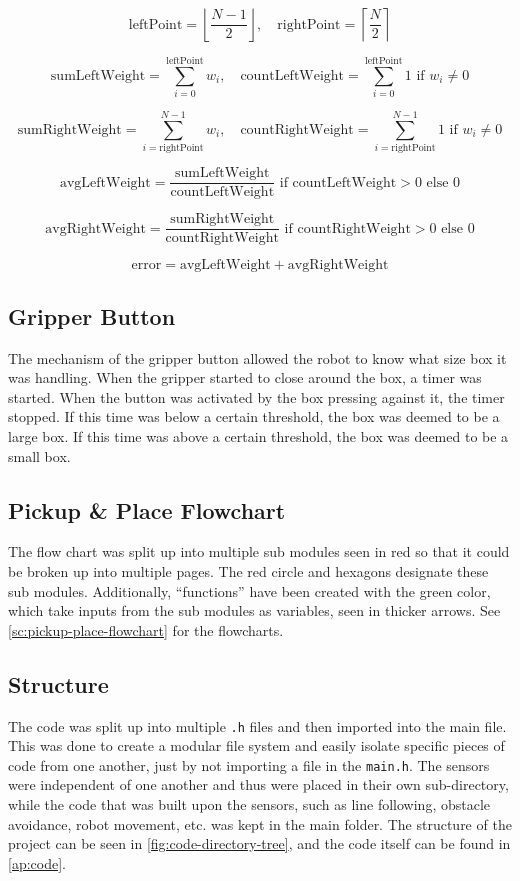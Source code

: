 \documentclass[11pt]{report}
\begin{document}
\[
\text{leftPoint} = \left\lfloor \frac{N-1}{2} \right\rfloor, \quad \text{rightPoint} = \left\lceil \frac{N}{2} \right\rceil
\]

\[
\text{sumLeftWeight} = \sum_{i=0}^{\text{leftPoint}} w_i, \quad \text{countLeftWeight} = \sum_{i=0}^{\text{leftPoint}} 1 \text{ if } w_i \neq 0
\]

\[
\text{sumRightWeight} = \sum_{i=\text{rightPoint}}^{N-1} w_i, \quad \text{countRightWeight} = \sum_{i=\text{rightPoint}}^{N-1} 1 \text{ if } w_i \neq 0
\]

\[
\text{avgLeftWeight} = \frac{\text{sumLeftWeight}}{\text{countLeftWeight}} \text{ if } \text{countLeftWeight} > 0 \text{ else } 0
\]

\[
\text{avgRightWeight} = \frac{\text{sumRightWeight}}{\text{countRightWeight}} \text{ if } \text{countRightWeight} > 0 \text{ else } 0
\]

\[
\text{error} = \text{avgLeftWeight} + \text{avgRightWeight}
\]

\subsection{Gripper Button}
The mechanism of the gripper button allowed the robot to know what size box it was handling. When the gripper started to close around the box, a timer was started. When the button was activated by the box pressing against it, the timer stopped. If this time was below a certain threshold, the box was deemed to be a large box. If this time was above a certain threshold, the box was deemed to be a small box. 

\subsection{Pickup \& Place Flowchart}

The flow chart was split up into multiple sub modules seen in red so that it could be broken up into multiple pages. The red circle and hexagons designate these sub modules. Additionally, ``functions'' have been created with the green color, which take inputs from the sub modules as variables, seen in thicker arrows. See \cref{sc:pickup-place-flowchart} for the flowcharts.

\subsection{Structure}

The code was split up into multiple \texttt{.h} files and then imported into the main file. This was done to create a modular file system and easily isolate specific pieces of code from one another, just by not importing a file in the \texttt{main.h}. The sensors were independent of one another and thus were placed in their own sub-directory, while the code that was built upon the sensors, such as line following, obstacle avoidance, robot movement, etc. was kept in the main folder. The structure of the project can be seen in \cref{fig:code-directory-tree}, and the code itself can be found in \cref{ap:code}.
\end{document}
